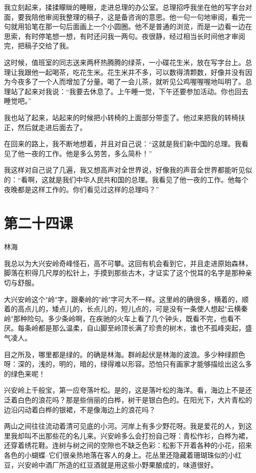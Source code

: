 \documentclass[12pt,UTF8]{ctexbook}
\begin{document}
我立刻起来，揉揉矇眬的睡眼，走进总理的办公室。总理招呼我坐在他的写字台对面，要我陪他审阅我整理的稿子，这是备咨询的意思。他一句一句地审阅，看完一句就用铅笔在那一句后面画上一个小圆圈。他不是普通的浏览，而是一边看一边在思索，有时停笔想一想，有时还问我一两句。夜很静，经过相当长时间他才审阅完，把稿子交给了我。

这时候，值班室的同志送来两杯热腾腾的绿茶，一小碟花生米，放在写字台上。总理让我跟他一起喝茶，吃花生米。花生米并不多，可以数得清颗数，好像并没有因为今夜多了一个人而增加了分量。喝了一会儿茶，就听见公鸡喔喔喔地叫明了。总理站了起来对我说：“我要去休息了。上午睡一觉，下午还要参加活动。你也回去睡觉吧。”

我也站了起来，站起来的时候把小转椅的上面部分带歪了。他过来把我的转椅扶正，然后就走进后面去了。

在回来的路上，我不断地想着，并且对自己说：“这就是我们新中国的总理。我看见了他一夜的工作。他是多么劳苦，多么简朴！”

我这样对自己说了几遍，我又想高声对全世界说，好像我的声音全世界都能听见似的：“看啊，这就是我们中华人民共和国的总理。我看见了他一夜的工作。他每个夜晚都是这样工作的。你们看见过这样的总理吗？”

\section{第二十四课}

林海

我总以为大兴安岭奇峰怪石，高不可攀。这回有机会看到它，并且走进原始森林，脚落在积得几尺厚的松针上，手摸到那些古木，才证实了这个悦耳的名字是那种亲切与舒服。

大兴安岭这个"岭"字，跟秦岭的"岭"字可大不一样。这里岭的确很多，横着的，顺着的高点儿的，矮点儿的，长点儿的，短儿点的，可是没有一条使人想起"云横秦岭"那种险句。多少条岭啊，在疾驰的火车上看了几个钟头，既看不完，也看不厌。每条岭都是那么温柔，自山脚至岭顶长满了珍贵的树木，谁也不孤峰突起，盛气凌人。

目之所及，哪里都是绿的。的确是林海。群岭起伏是林海的波浪。多少种绿颜色呀：深的，浅的，明的，暗的，绿得难以形容。恐怕只有画家才能够描绘出这么多的绿色来呢！

兴安岭上千般宝，第一应夸落叶松。是的，这是落叶松的海洋。看，海边上不是还泛着白色的浪花吗？那是些俏丽的白桦，树干是银白色的。在阳光下，大片青松的边沿闪动着白桦的银裙，不是像海边上的浪花吗？

两山之间往往流动着清可见底的小河。河岸上有多少野花呀。我是爱花的人，到这里我却叫不出那些花的名儿来。兴安岭多么会打扮自己呀：青松作衫，白桦为裙，还穿着绣花鞋。连树与树之间的空隙也不缺乏色彩：松影下开着各种的小花，招来各色的小蝴蝶--它们很亲热地落在客人的身上。花丛里还隐藏着珊瑚珠似的小红豆，兴安岭中酒厂所造的红豆酒就是用这些小野果酿成的，味道很好。
\end{document}
